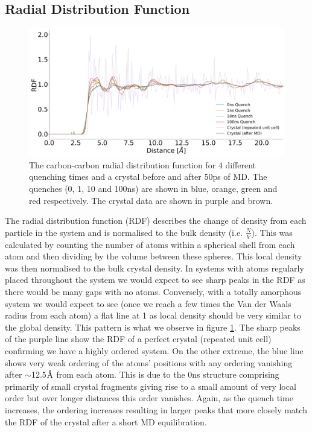 \subsection{Radial Distribution Function}
\begin{figure}[H]
	\centering
	\includegraphics[width=\textwidth]{./img/DifferentQuenchTimes/RDF.png}
	\caption{\label{fig:RDF}The carbon-carbon radial distribution function for 4 different quenching times and a crystal before and after 50ps of MD. The quenches (0, 1, 10 and 100ns) are shown in blue, orange, green and red respectively. The crystal data are shown in purple and brown.}
\end{figure}
\noindent The radial distribution function (RDF) describes the change of density from each particle in the system and is normalised to the bulk density (i.e. $\frac{N}{V}$). This was calculated by counting the number of atoms within a spherical shell from each atom and then dividing by the volume between these spheres. This local density was then normalised to the bulk crystal density. In systems with atoms regularly placed throughout the system we would expect to see sharp peaks in the RDF as there would be many gaps with no atoms. Conversely, with a totally amorphous system we would expect to see (once we reach a few times the Van der Waals radius from each atom) a flat line at 1 as local density should be very similar to the global density. This pattern is what we observe in figure \ref{fig:RDF}. The sharp peaks of the purple line show the RDF of a perfect crystal (repeated unit cell) confirming we have a highly ordered system. On the other extreme, the blue line shows very weak ordering of the atoms' positions with any ordering vanishing after $\sim$12.5$\text{\normalfont\AA}$ from each atom. This is due to the 0ns structure comprising primarily of small crystal fragments giving rise to a small amount of very local order but over longer distances this order vanishes. Again, as the quench time increases, the ordering increases resulting in larger peaks that more closely match the RDF of the crystal after a short MD equilibration.

